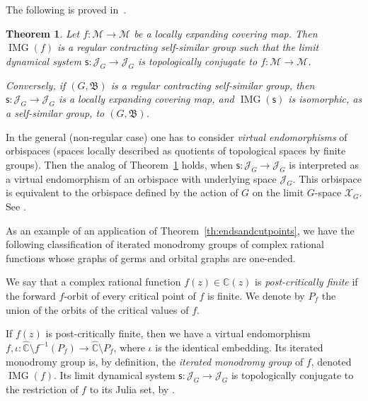 \documentclass[11pt]{amsart}
\newcommand{\bim}{\mathfrak{B}}
\newcommand{\arr}{\longrightarrow}
\newcommand{\lims}[1][G]{\mathcal{J}_{#1}}
\newcommand{\limg}[1][G]{\mathcal{X}_{#1}}
\newcommand{\M}{\ensuremath{\mathcal{M}}}%
\theoremstyle{definition}
\theoremstyle{plain}
\newtheorem{thm}[defin]{Theorem}
\newtheorem{main thm}{Theorem}
\theoremstyle{remark}
\theoremstyle{plain}
\begin{document}
The following is proved in~\cite[Corollary~4.5.22 and Proposition~4.5.23]{nek:dyngroups}.

\begin{thm}
\label{th:imgmain}
    Let $f\colon\M\arr\M$ be a locally expanding covering map. Then $\mathop{\mathrm{IMG}}(f)$ is a regular contracting self-similar group such that the limit dynamical system $\mathsf{s}\colon\lims\arr\lims$ is topologically conjugate to $f\colon\M\arr\M$.

    Conversely, if $(G, \bim)$ is a regular contracting self-similar group, then $\mathsf{s}\colon\lims\arr\lims$ is a locally expanding covering map, and $\mathop{\mathrm{IMG}}(\mathsf{s})$ is isomorphic, as a self-similar group, to $(G, \bim)$.
\end{thm}

In the general (non-regular case) one has to consider \emph{virtual endomorphisms} of orbispaces (spaces locally described as quotients of topological spaces by finite groups). Then the analog of Theorem~\ref{th:imgmain} holds, when $\mathsf{s}\colon\lims\arr\lims$ is interpreted as a virtual endomorphism of an orbispace with underlying space $\lims$.
This orbispace is equivalent to the orbispace defined by the action of $G$ on the limit $G$-space $\limg$. See \cite[Chapter 5]{Nek:book}.





As an example of an application of Theorem~\ref{th:endsandcutpoints}, we have the following classification of iterated monodromy groups of complex rational functions whose graphs of germs and orbital graphs are one-ended.

We say that a complex rational function $f(z)\in\mathbb{C}(z)$ is \emph{post-critically finite} if the forward $f$-orbit of every critical point of $f$ is finite. We denote by $P_f$ the union of the orbits of the critical values of $f$. 

If $f(z)$ is post-critically finite, then we have a virtual endomorphism $f, \iota\colon\widehat{\mathbb{C}}\setminus f^{-1}(P_f)\arr\widehat{\mathbb{C}}\setminus P_f$, where $\iota$ is the identical embedding. Its iterated monodromy group is, by definition, the \emph{iterated monodromy group} of $f$, denoted $\mathop{\mathrm{IMG}}(f)$. Its limit dynamical system $\mathsf{s}\colon \lims\to \lims$ is topologically conjugate to the restriction of $f$ to its Julia set, by \cite[Theorem 5.5.3]{Nek:book}.
\end{document}
